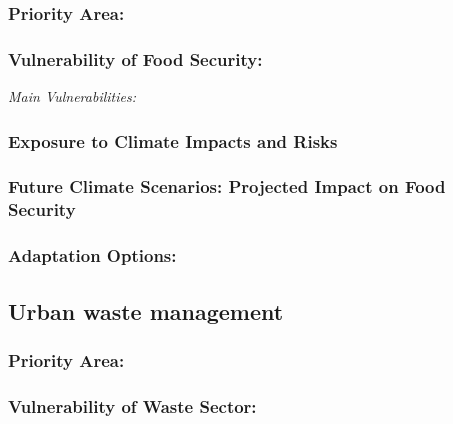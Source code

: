 \documentclass[
]{book}
\begin{document}
\hypertarget{priority-area-2}{%
\subsubsection{Priority Area:}\label{priority-area-2}}

\hypertarget{vulnerability-of-food-security-1}{%
\subsubsection{Vulnerability of Food Security:}\label{vulnerability-of-food-security-1}}

\emph{Main Vulnerabilities:}

\hypertarget{exposure-to-climate-impacts-and-risks-18}{%
\subsubsection{Exposure to Climate Impacts and Risks}\label{exposure-to-climate-impacts-and-risks-18}}

\hypertarget{future-climate-scenarios-projected-impact-on-food-security-1}{%
\subsubsection{Future Climate Scenarios: Projected Impact on Food Security}\label{future-climate-scenarios-projected-impact-on-food-security-1}}

\hypertarget{adaptation-options-18}{%
\subsubsection{Adaptation Options:}\label{adaptation-options-18}}

\hypertarget{urban-waste-management-1}{%
\subsection{Urban waste management}\label{urban-waste-management-1}}

\hypertarget{priority-area-3}{%
\subsubsection{Priority Area:}\label{priority-area-3}}

\hypertarget{vulnerability-of-waste-sector-1}{%
\subsubsection{Vulnerability of Waste Sector:}\label{vulnerability-of-waste-sector-1}}
\end{document}
